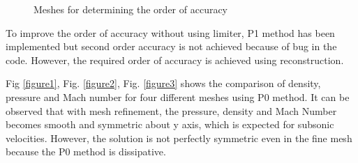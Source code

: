 \documentclass[12pt]{elsarticle}
\begin{document}
	\begin{figure}[ht]
		\centering
		\caption{Meshes for determining the order of accuracy}
		\label{errorfunction}
	\end{figure}
	
	To improve the order of accuracy without using limiter, P1 method has been implemented but second order accuracy is not achieved because of bug in the code. However, the required order of accuracy is achieved using reconstruction.
	\clearpage
	
	Fig \ref{figure1}, Fig. \ref{figure2}, Fig. \ref{figure3} shows the comparison of density, pressure and Mach number for four different meshes using P0 method. It can be observed that with mesh refinement, the pressure, density and Mach Number becomes smooth and symmetric about y axis, which is expected for subsonic velocities. However, the solution is not perfectly symmetric even in the fine mesh because the P0 method is dissipative. 
	
\end{document}
